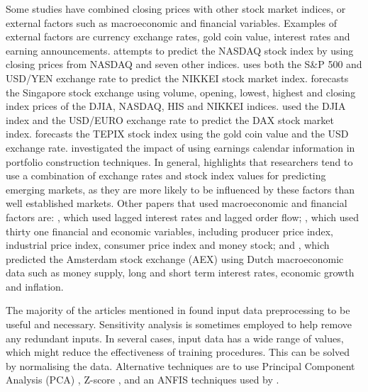 \documentclass{UoYCSproject}
\begin{document}
Some studies have combined closing prices with other stock market indices, or external factors such as macroeconomic and financial variables. Examples of external factors are currency exchange rates, gold coin value, interest rates and earning announcements. \cite{ajith2003hybrid} attempts to predict the NASDAQ stock index by using closing prices from NASDAQ and seven other indices. \cite{huang2005forecasting} uses both the S\&P 500 and USD/YEN exchange rate to predict the NIKKEI stock market index. \cite{phua2001neural} forecasts the Singapore stock exchange using volume, opening, lowest, highest and closing index prices of the DJIA, NASDAQ, HIS and NIKKEI indices. \cite{siekmann1999information} used the DJIA index and the USD/EURO exchange rate to predict the DAX stock market index. \cite{tabrizi2000stock} forecasts the TEPIX stock index using the gold coin value and the USD exchange rate. \cite{levodeanschi2016} investigated the impact of using earnings calendar information in portfolio construction techniques. In general, \cite{atsalakis2009surveying} highlights that researchers tend to use a combination of exchange rates and stock index values for predicting emerging markets, as they are more likely to be influenced by these factors than well established markets. Other papers that used macroeconomic and financial factors are: \cite{gradojevic2002neuro}, which used lagged interest rates and lagged order flow; \cite{thawornwong2004adaptive}, which used thirty one financial and economic variables, including producer price index, industrial price index, consumer price index and money stock; and \cite{setnes1999fuzzy}, which predicted the Amsterdam stock exchange (AEX) using Dutch macroeconomic data such as money supply, long and short term interest rates, economic growth and inflation.

The majority of the articles mentioned in \cite{atsalakis2009surveying} found input data preprocessing to be useful and necessary. Sensitivity analysis is sometimes employed to help remove any redundant inputs. In several cases, input data has a wide range of values, which might reduce the effectiveness of training procedures. This can be solved by normalising the data. Alternative techniques are to use Principal Component Analysis (PCA) \cite{ajith2003hybrid}, Z-score \cite{leigh2002analysis}, and an ANFIS techniques used by \cite{atsalakis2006neuro}. 
\end{document}
